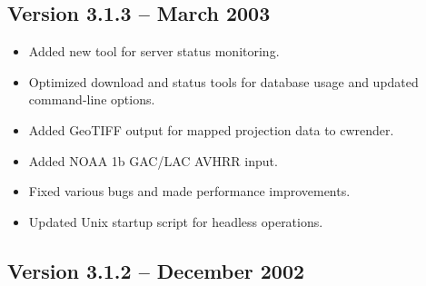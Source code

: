 
\subsection*{Version 3.1.3 -- March 2003}

\begin{itemize}

  \item Added new tool for server status monitoring.

  \item Optimized download and status tools for database usage and
  updated command-line options.

  \item Added GeoTIFF output for mapped projection data to cwrender.

  \item Added NOAA 1b GAC/LAC AVHRR input.

  \item Fixed various bugs and made performance improvements.

  \item Updated Unix startup script for headless operations.

\end{itemize}


\subsection*{Version 3.1.2 -- December 2002}

